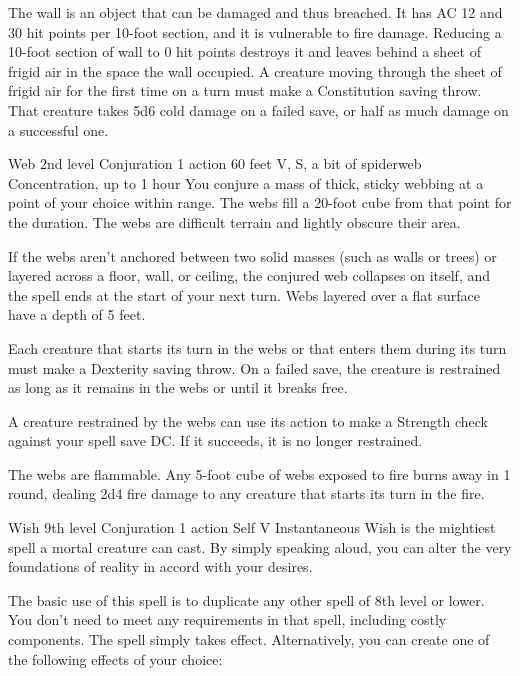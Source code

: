\documentclass[10pt,a4paper,twoside,bg=print,twocolumn,openany,nodeprecatedcode]{dndbook}
\begin{document}
The wall is an object that can be damaged and thus breached. It has AC 12 and 30 hit points per 10-foot section, and it is vulnerable to fire damage. Reducing a 10-foot section of wall to 0 hit points destroys it and leaves behind a sheet of frigid air in the space the wall occupied. A creature moving through the sheet of frigid air for the first time on a turn must make a Constitution saving throw. That creature takes 5d6 cold damage on a failed save, or half as much damage on a successful one.



\DndSpellHeader%
{Web}
{2nd level Conjuration}
{1 action}
{60 feet}
{V, S, a bit of spiderweb}
{Concentration, up to 1 hour}
You conjure a mass of thick, sticky webbing at a point of your choice within range. The webs fill a 20-foot cube from that point for the duration. The webs are difficult terrain and lightly obscure their area.

If the webs aren't anchored between two solid masses (such as walls or trees) or layered across a floor, wall, or ceiling, the conjured web collapses on itself, and the spell ends at the start of your next turn. Webs layered over a flat surface have a depth of 5 feet.

Each creature that starts its turn in the webs or that enters them during its turn must make a Dexterity saving throw. On a failed save, the creature is restrained as long as it remains in the webs or until it breaks free.

A creature restrained by the webs can use its action to make a Strength check against your spell save DC. If it succeeds, it is no longer restrained.

The webs are flammable. Any 5-foot cube of webs exposed to fire burns away in 1 round, dealing 2d4 fire damage to any creature that starts its turn in the fire.



\DndSpellHeader%
{Wish}
{9th level Conjuration}
{1 action}
{Self}
{V}
{Instantaneous}
Wish is the mightiest spell a mortal creature can cast. By simply speaking aloud, you can alter the very foundations of reality in accord with your desires.

The basic use of this spell is to duplicate any other spell of 8th level or lower. You don't need to meet any requirements in that spell, including costly components. The spell simply takes effect. Alternatively, you can create one of the following effects of your choice:
\end{document}
